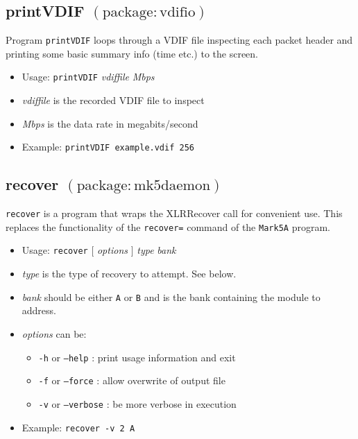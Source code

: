 
\subsection{printVDIF {\small $\mathrm{(package: vdifio)}$} \label{sec:printVDIF}}

Program {\tt printVDIF} loops through a VDIF file inspecting each packet header and printing some basic summary info (time etc.) to the screen.

\begin{itemize}
\item[] Usage: {\tt printVDIF} {\em vdiffile} {\em Mbps}

\item[] {\em vdiffile} is the recorded VDIF file to inspect
\item[] {\em Mbps} is the data rate in megabits/second

\item[] Example: {\tt printVDIF example.vdif 256}
\end{itemize}




\subsection{recover {\small $\mathrm{(package: mk5daemon)}$}} \label{sec:recover}

{\tt recover} is a program that wraps the XLRRecover call for convenient use.
This replaces the functionality of the {\tt recover=} command of the {\tt Mark5A} program.

\begin{itemize}
\item[] Usage: {\tt recover} $[$ {\em options} $]$ {\em type} {\em bank}

\item[] {\em type} is the type of recovery to attempt.  See below.
\item[] {\em bank} should be either {\tt A} or {\tt B} and is the bank containing the module to address.
\item[] {\em options} can be:
\begin{itemize}
\item[] {\tt -h} or {\tt --help} : print usage information and exit
\item[] {\tt -f} or {\tt --force} : allow overwrite of output file
\item[] {\tt -v} or {\tt --verbose} : be more verbose in execution
\end{itemize}
\item[] Example: {\tt recover -v 2 A}
\end{itemize}


